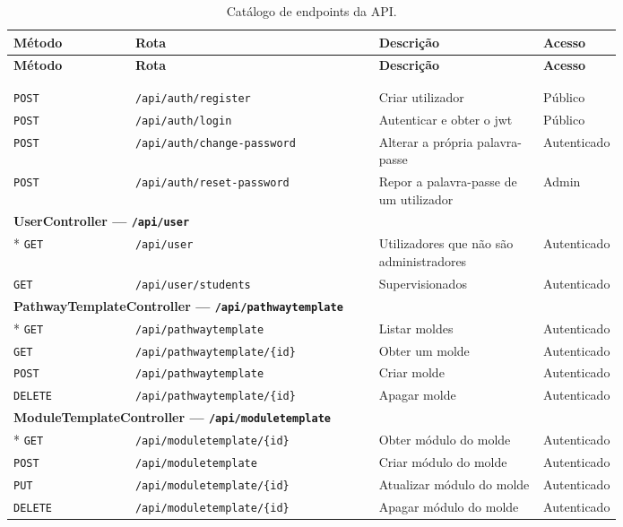 \newcommand{\ep}[4]{\texttt{#1} & \texttt{#2} & #3 & #4 \\}
\newcommand{\grupo}[1]{\midrule\multicolumn{4}{l}{\textbf{#1}} \\*}

\begingroup\footnotesize
\begin{longtable}{l >{\raggedright\arraybackslash}p{0.40\linewidth} >{\raggedright\arraybackslash}p{0.27\linewidth} >{\raggedright\arraybackslash}p{0.12\linewidth}}
\toprule
\textbf{Método} & \textbf{Rota} & \textbf{Descrição} & \textbf{Acesso} \\
\midrule
\endfirsthead
\toprule
\textbf{Método} & \textbf{Rota} & \textbf{Descrição} & \textbf{Acesso} \\
\midrule
\endhead
\bottomrule
\endfoot
\bottomrule
\caption{Catálogo de endpoints da API.}\label{tab:endpoints}\\
\endlastfoot
\multicolumn{4}{l}{\textbf{AuthController} --- \texttt{/api/auth}} \\*
\ep{POST}{/\allowbreak{}api/\allowbreak{}auth/\allowbreak{}register}{Criar utilizador}{Público}
\ep{POST}{/\allowbreak{}api/\allowbreak{}auth/\allowbreak{}login}{Autenticar e obter o \gls{jwt}}{Público}
\ep{POST}{/\allowbreak{}api/\allowbreak{}auth/\allowbreak{}change-password}{Alterar a própria palavra-passe}{Autenticado}
\ep{POST}{/\allowbreak{}api/\allowbreak{}auth/\allowbreak{}reset-password}{Repor a palavra-passe de um utilizador}{Admin}
\grupo{UserController --- \texttt{/api/user}}
\ep{GET}{/\allowbreak{}api/\allowbreak{}user}{Utilizadores que não são administradores}{Autenticado}
\ep{GET}{/\allowbreak{}api/\allowbreak{}user/\allowbreak{}students}{Supervisionados}{Autenticado}
\grupo{PathwayTemplateController --- \texttt{/api/pathwaytemplate}}
\ep{GET}{/\allowbreak{}api/\allowbreak{}pathwaytemplate}{Listar moldes}{Autenticado}
\ep{GET}{/\allowbreak{}api/\allowbreak{}pathwaytemplate/\allowbreak{}\{id\}}{Obter um molde}{Autenticado}
\ep{POST}{/\allowbreak{}api/\allowbreak{}pathwaytemplate}{Criar molde}{Autenticado}
\ep{DELETE}{/\allowbreak{}api/\allowbreak{}pathwaytemplate/\allowbreak{}\{id\}}{Apagar molde}{Autenticado}
\grupo{ModuleTemplateController --- \texttt{/api/moduletemplate}}
\ep{GET}{/\allowbreak{}api/\allowbreak{}moduletemplate/\allowbreak{}\{id\}}{Obter módulo do molde}{Autenticado}
\ep{POST}{/\allowbreak{}api/\allowbreak{}moduletemplate}{Criar módulo do molde}{Autenticado}
\ep{PUT}{/\allowbreak{}api/\allowbreak{}moduletemplate/\allowbreak{}\{id\}}{Atualizar módulo do molde}{Autenticado}
\ep{DELETE}{/\allowbreak{}api/\allowbreak{}moduletemplate/\allowbreak{}\{id\}}{Apagar módulo do molde}{Autenticado}

\end{longtable}
